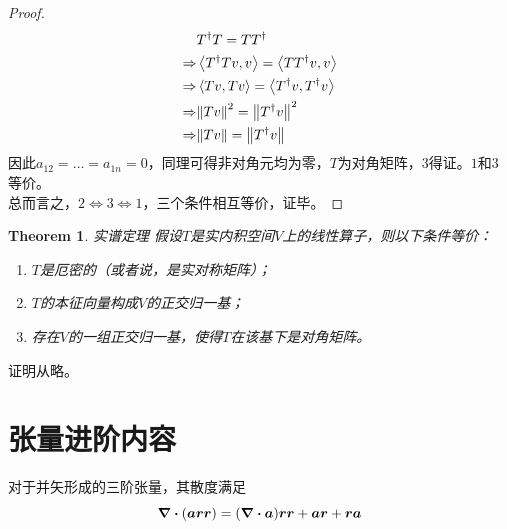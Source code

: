 \documentclass[12pt,a4paper,openany,twoside]{book}
\newtheorem{theorem}{Theorem}[section]
\numberwithin{equation}{section}
\newcommand{\mean}[1]{\left\langle #1 \right\rangle}
\begin{document}
\begin{proof}
\begin{equation}
\begin{aligned}
              &T^\dagger T=TT^\dagger\\
              \Rightarrow&\mean{T^\dagger Tv,v}=\mean{TT^\dagger v,v}\\
              \Rightarrow&\mean{Tv,Tv}=\mean{T^\dagger v,T^\dagger v}\\
              \Rightarrow&\norm{Tv}^2=\norm{T^\dagger v}^2\\
              \Rightarrow&\norm{Tv}=\norm{T^\dagger v}
            \end{aligned}
          \end{equation}
          因此$a_{12}=\dots=a_{1n}=0$，同理可得非对角元均为零，$T$为对角矩阵，$3$得证。$1$和$3$等价。\\
          总而言之，$2\Leftrightarrow3\Leftrightarrow1$，三个条件相互等价，证毕。
        \end{proof}
        \begin{theorem} 实谱定理
          假设$T$是实内积空间$V$上的线性算子，则以下条件等价：
          \begin{enumerate}
            \item $T$是厄密的（或者说，是实对称矩阵）；
            \item $T$的本征向量构成$V$的正交归一基；
            \item 存在$V$的一组正交归一基，使得$T$在该基下是对角矩阵。
          \end{enumerate}
        \end{theorem}
        证明从略。

      \section{张量进阶内容}
        \label{tensor_higher}
        对于并矢形成的三阶张量，其散度满足
        \begin{equation}
          \div{\qty(\vb*{a}\vb*{r}\vb*{r})} = \qty(\div{\vb*{a}})\vb*{r}\vb*{r} + \vb*{a} \vb*{r}+ \vb*{r}\vb*{a}
        \end{equation}
\end{document}
